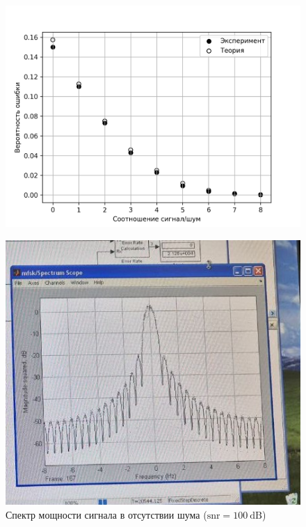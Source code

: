 \documentclass[14pt, a4paper]{article}
\begin{document}
\begin{figure}[H]
\centering
\includegraphics[width=.8\linewidth]{../images/rt2-9}
\end{figure}

\begin{figure}[H]
\centering
\includegraphics[width=.8\linewidth]{../images/rt2-9s}
\caption{Спектр мощности сигнала в отсутствии шума ($\text{snr}=100\ \text{dB}$)}
\end{figure}
\end{document}
